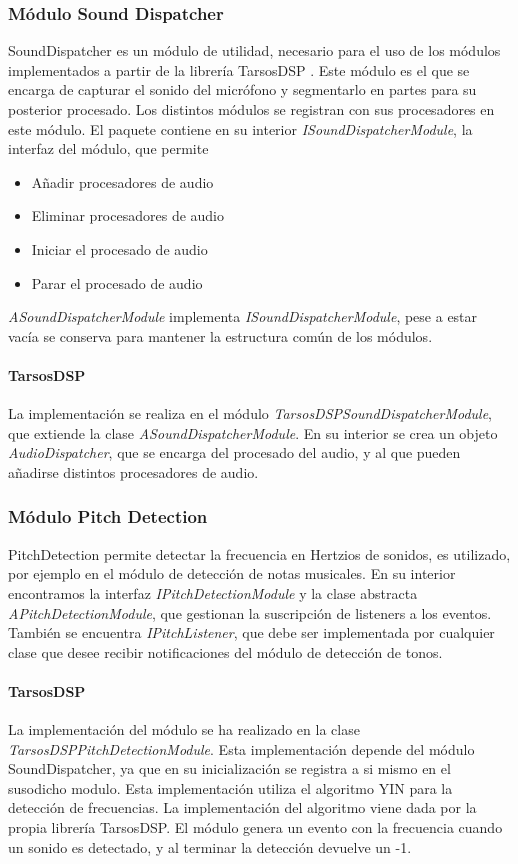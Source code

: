 \subsubsection{Módulo Sound Dispatcher}
SoundDispatcher es un módulo de utilidad, necesario para el uso de los módulos implementados a partir de la librería TarsosDSP \cite{six2014tarsosdsp}.
Este módulo es el que se encarga de capturar el sonido del micrófono y segmentarlo en partes para su posterior procesado. Los distintos módulos se registran con sus procesadores en este módulo.
El paquete contiene en su interior \textit{ISoundDispatcherModule}, la interfaz del módulo, que permite
\begin{itemize}
	\item Añadir procesadores de audio
	\item Eliminar procesadores de audio
	\item Iniciar el procesado de audio
	\item Parar el procesado de audio
\end{itemize}
\textit{ASoundDispatcherModule} implementa \textit{ISoundDispatcherModule}, pese a estar vacía se conserva para mantener la estructura común de los módulos.
\paragraph*{TarsosDSP\\}
La implementación se realiza en el módulo \textit{TarsosDSPSoundDispatcherModule}, que extiende la clase \textit{ASoundDispatcherModule}.
En su interior se crea un objeto \textit{AudioDispatcher}, que se encarga del procesado del audio, y al que pueden añadirse distintos procesadores de audio.


\subsubsection{Módulo Pitch Detection}
PitchDetection permite detectar la frecuencia en Hertzios de sonidos, es utilizado, por ejemplo en el módulo de detección de notas musicales.
En su interior encontramos la interfaz \textit{IPitchDetectionModule} y la clase abstracta \textit{APitchDetectionModule}, que gestionan la suscripción de listeners a los eventos. También se encuentra \textit{IPitchListener}, que debe ser implementada por cualquier clase que desee recibir notificaciones del módulo de detección de tonos.

\paragraph*{TarsosDSP \\}
La implementación del módulo se ha realizado en la clase \textit{TarsosDSPPitchDetectionModule}. Esta implementación depende del módulo SoundDispatcher, ya que en su inicialización se registra a si mismo en el susodicho modulo.
Esta implementación utiliza el algoritmo YIN \cite{de_YINa_f2002} para la detección de frecuencias. La implementación del algoritmo viene dada por la propia librería TarsosDSP. El módulo genera un evento con la frecuencia cuando un sonido es detectado, y al terminar la detección devuelve un -1.

